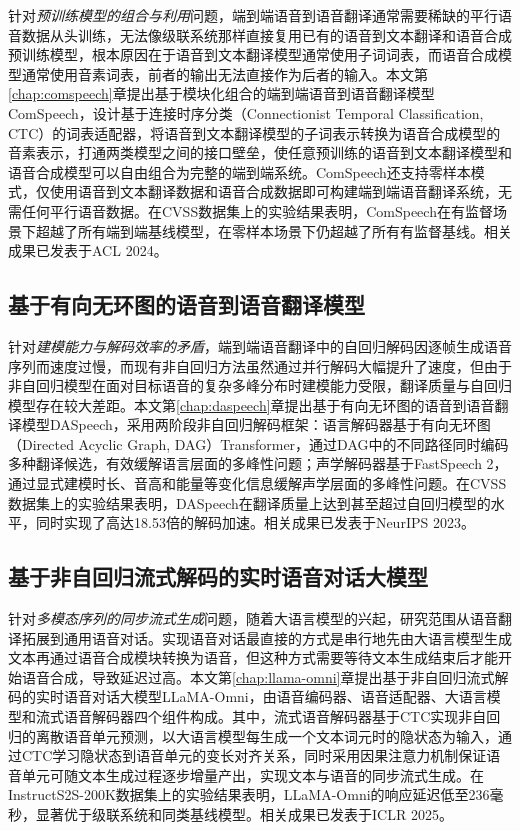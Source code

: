 针对\textit{预训练模型的组合与利用}问题，端到端语音到语音翻译通常需要稀缺的平行语音数据从头训练，无法像级联系统那样直接复用已有的语音到文本翻译和语音合成预训练模型，根本原因在于语音到文本翻译模型通常使用子词词表，而语音合成模型通常使用音素词表，前者的输出无法直接作为后者的输入。本文第\ref{chap:comspeech}章提出基于模块化组合的端到端语音到语音翻译模型ComSpeech，设计基于连接时序分类（Connectionist Temporal Classification, CTC）的词表适配器，将语音到文本翻译模型的子词表示转换为语音合成模型的音素表示，打通两类模型之间的接口壁垒，使任意预训练的语音到文本翻译模型和语音合成模型可以自由组合为完整的端到端系统。ComSpeech还支持零样本模式，仅使用语音到文本翻译数据和语音合成数据即可构建端到端语音翻译系统，无需任何平行语音数据。在CVSS数据集上的实验结果表明，ComSpeech在有监督场景下超越了所有端到端基线模型，在零样本场景下仍超越了所有有监督基线。相关成果已发表于ACL 2024。

\subsection{基于有向无环图的语音到语音翻译模型}

针对\textit{建模能力与解码效率的矛盾}，端到端语音翻译中的自回归解码因逐帧生成语音序列而速度过慢，而现有非自回归方法虽然通过并行解码大幅提升了速度，但由于非自回归模型在面对目标语音的复杂多峰分布时建模能力受限，翻译质量与自回归模型存在较大差距。本文第\ref{chap:daspeech}章提出基于有向无环图的语音到语音翻译模型DASpeech，采用两阶段非自回归解码框架：语言解码器基于有向无环图（Directed Acyclic Graph, DAG）Transformer，通过DAG中的不同路径同时编码多种翻译候选，有效缓解语言层面的多峰性问题；声学解码器基于FastSpeech 2，通过显式建模时长、音高和能量等变化信息缓解声学层面的多峰性问题。在CVSS数据集上的实验结果表明，DASpeech在翻译质量上达到甚至超过自回归模型的水平，同时实现了高达18.53倍的解码加速。相关成果已发表于NeurIPS 2023。

\subsection{基于非自回归流式解码的实时语音对话大模型}

针对\textit{多模态序列的同步流式生成}问题，随着大语言模型的兴起，研究范围从语音翻译拓展到通用语音对话。实现语音对话最直接的方式是串行地先由大语言模型生成文本再通过语音合成模块转换为语音，但这种方式需要等待文本生成结束后才能开始语音合成，导致延迟过高。本文第\ref{chap:llama-omni}章提出基于非自回归流式解码的实时语音对话大模型LLaMA-Omni，由语音编码器、语音适配器、大语言模型和流式语音解码器四个组件构成。其中，流式语音解码器基于CTC实现非自回归的离散语音单元预测，以大语言模型每生成一个文本词元时的隐状态为输入，通过CTC学习隐状态到语音单元的变长对齐关系，同时采用因果注意力机制保证语音单元可随文本生成过程逐步增量产出，实现文本与语音的同步流式生成。在InstructS2S-200K数据集上的实验结果表明，LLaMA-Omni的响应延迟低至236毫秒，显著优于级联系统和同类基线模型。相关成果已发表于ICLR 2025。

